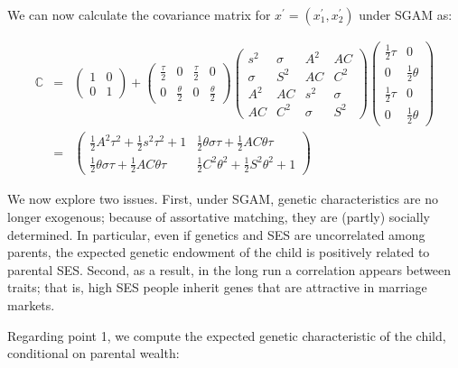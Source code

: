 \documentclass[
]{article}
\theoremstyle{definition}
\theoremstyle{definition}
\theoremstyle{definition}
\theoremstyle{definition}
\theoremstyle{remark}
\begin{document}
We can now calculate the covariance matrix for
\(x^\prime = (x_{1}^{\prime }, x_{2}^{\prime })\) under SGAM as:

\begin{eqnarray}
\mathbb{C} &=&\left( 
\begin{array}{cc}
1 & 0 \\ 
0 & 1%
\end{array}%
\right) +\left( 
\begin{array}{cccc}
\frac{\tau }{2} & 0 & \frac{\tau }{2} & 0 \\ 
0 & \frac{\theta }{2} & 0 & \frac{\theta }{2}%
\end{array}%
\right) \allowbreak \left( 
\begin{array}{cccc}
s^{2} & \sigma  & A^{2} & AC \\ 
\sigma  & S^{2} & AC & C^{2} \\ 
A^{2} & AC & s^{2} & \sigma  \\ 
AC & C^{2} & \sigma  & S^{2}%
\end{array}%
\right) \allowbreak \left( 
\begin{array}{cc}
\frac{1}{2}\tau  & 0 \\ 
0 & \frac{1}{2}\theta  \\ 
\frac{1}{2}\tau  & 0 \\ 
0 & \frac{1}{2}\theta 
\end{array}%
\right) \nonumber \\
&=&\left( 
\begin{array}{cc}
\frac{1}{2}A^{2}\tau ^{2}+\frac{1}{2}s^{2}\tau ^{2}+1 & \frac{1}{2}\theta
\sigma \tau +\frac{1}{2}AC\theta \tau  \\ 
\frac{1}{2}\theta \sigma \tau +\frac{1}{2}AC\theta \tau  & \frac{1}{2}%
C^{2}\theta ^{2}+\frac{1}{2}S^{2}\theta ^{2}+1%
\end{array}%
\right) \allowbreak \label{cov-children-SGAM}
\end{eqnarray}
\newline

We now explore two issues. First, under SGAM, genetic characteristics are no
longer exogenous; because of assortative matching, they are (partly) socially
determined. In particular, even if genetics and SES are uncorrelated among
parents, the expected genetic endowment of the child is positively related to
parental SES. Second, as a result, in the long run a correlation appears between
traits; that is, high SES people inherit genes that are attractive in marriage
markets.

Regarding point 1, we compute the expected genetic characteristic of the
child, conditional on parental wealth:
\end{document}

